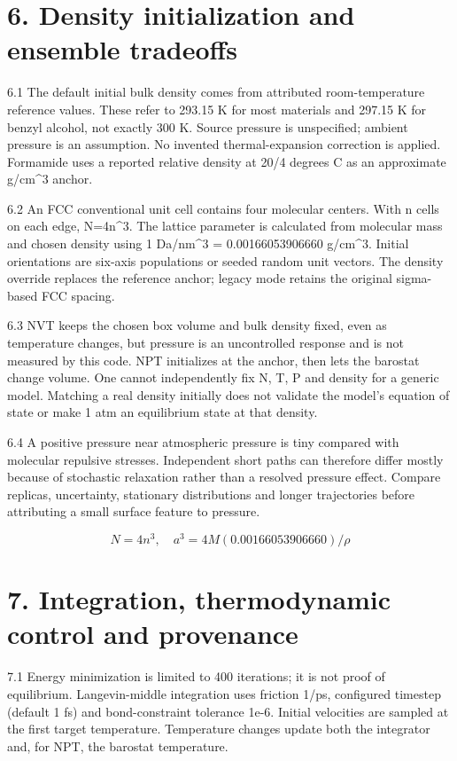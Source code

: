 \documentclass[11pt]{article}
\begin{document}
\section*{6. Density initialization and ensemble tradeoffs}
6.1 The default initial bulk density comes from attributed room-temperature reference values. These refer to 293.15 K for most materials and 297.15 K for benzyl alcohol, not exactly 300 K. Source pressure is unspecified; ambient pressure is an assumption. No invented thermal-expansion correction is applied. Formamide uses a reported relative density at 20/4 degrees C as an approximate g/cm\textasciicircum{}3 anchor.


6.2 An FCC conventional unit cell contains four molecular centers. With n cells on each edge, N=4n\textasciicircum{}3. The lattice parameter is calculated from molecular mass and chosen density using 1 Da/nm\textasciicircum{}3 = 0.00166053906660 g/cm\textasciicircum{}3. Initial orientations are six-axis populations or seeded random unit vectors. The density override replaces the reference anchor; legacy mode retains the original sigma-based FCC spacing.


6.3 NVT keeps the chosen box volume and bulk density fixed, even as temperature changes, but pressure is an uncontrolled response and is not measured by this code. NPT initializes at the anchor, then lets the barostat change volume. One cannot independently fix N, T, P and density for a generic model. Matching a real density initially does not validate the model's equation of state or make 1 atm an equilibrium state at that density.


6.4 A positive pressure near atmospheric pressure is tiny compared with molecular repulsive stresses. Independent short paths can therefore differ mostly because of stochastic relaxation rather than a resolved pressure effect. Compare replicas, uncertainty, stationary distributions and longer trajectories before attributing a small surface feature to pressure.


\[N=4n^3,\quad a^3=4M(0.00166053906660)/\rho\]
\section*{7. Integration, thermodynamic control and provenance}
7.1 Energy minimization is limited to 400 iterations; it is not proof of equilibrium. Langevin-middle integration uses friction 1/ps, configured timestep (default 1 fs) and bond-constraint tolerance 1e-6. Initial velocities are sampled at the first target temperature. Temperature changes update both the integrator and, for NPT, the barostat temperature.
\end{document}
